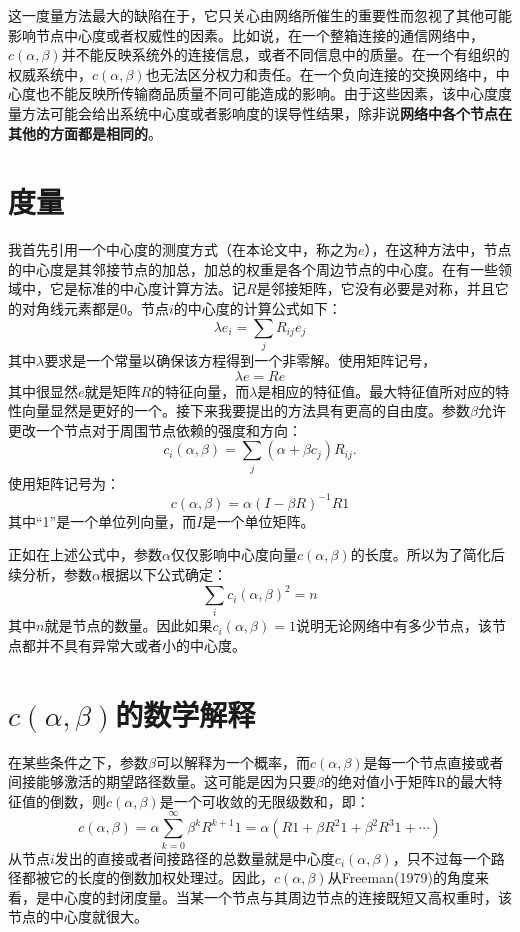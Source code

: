 \documentclass{ctexart}
\begin{document}
        这一度量方法最大的缺陷在于，它只关心由网络所催生的重要性而忽视了其他可能影响节点中心度或者权威性的因素。比如说，在一个整箱连接的通信网络中，$c(\alpha,\beta)$并不能反映系统外的连接信息，或者不同信息中的质量。在一个有组织的权威系统中，$c(\alpha,\beta)$也无法区分权力和责任。在一个负向连接的交换网络中，中心度也不能反映所传输商品质量不同可能造成的影响。由于这些因素，该中心度度量方法可能会给出系统中心度或者影响度的误导性结果，除非说\textbf{网络中各个节点在其他的方面都是相同的}。
        
    \section{度量}
        我首先引用一个中心度的测度方式（在本论文中，称之为$e$），在这种方法中，节点的中心度是其邻接节点的加总，加总的权重是各个周边节点的中心度。在有一些领域中，它是标准的中心度计算方法。记$R$是邻接矩阵，它没有必要是对称，并且它的对角线元素都是0。节点$i$的中心度的计算公式如下：
        $$
            \lambda e_i = \sum_j R_{ij} e_j
        $$
        其中$\lambda$要求是一个常量以确保该方程得到一个非零解。使用矩阵记号，
        $$
            \lambda e = Re
        $$
        其中很显然$e$就是矩阵$R$的特征向量，而$\lambda$是相应的特征值。最大特征值所对应的特性向量显然是更好的一个。接下来我要提出的方法具有更高的自由度。参数$\beta$允许更改一个节点对于周围节点依赖的强度和方向：
        $$
            c_i(\alpha,\beta) = \sum_j(\alpha + \beta c_j)R_{ij}.
        $$
        使用矩阵记号为：
        $$
            c(\alpha,\beta) = \alpha(I-\beta R)^{-1} R1
        $$
        其中“1”是一个单位列向量，而$I$是一个单位矩阵。
        
        正如在上述公式中，参数$\alpha$仅仅影响中心度向量$c(\alpha,\beta)$的长度。所以为了简化后续分析，参数$\alpha$根据以下公式确定：
        $$
            \sum_i c_i(\alpha,\beta)^2 = n
        $$
        其中$n$就是节点的数量。因此如果$c_i(\alpha,\beta)=1$说明无论网络中有多少节点，该节点都并不具有异常大或者小的中心度。
    \section{$c(\alpha,\beta)$的数学解释}
        在某些条件之下，参数$\beta$可以解释为一个概率，而$c(\alpha,\beta)$是每一个节点直接或者间接能够激活的期望路径数量。这可能是因为只要$\beta$的绝对值小于矩阵R的最大特征值的倒数，则$c(\alpha,\beta)$是一个可收敛的无限级数和，即：
        $$
            c(\alpha,\beta) = \alpha \sum_{k=0}^{\infty}\beta^k R^{k+1} 1 = \alpha(R 1 + \beta R^2 1 + \beta^2 R^3 1 + \cdots)
        $$
        从节点$i$发出的直接或者间接路径的总数量就是中心度$c_i(\alpha,\beta)$，只不过每一个路径都被它的长度的倒数加权处理过。因此，$c(\alpha,\beta)$从Freeman(1979)的角度来看，是中心度的封闭度量。当某一个节点与其周边节点的连接既短又高权重时，该节点的中心度就很大。
        
\end{document}

